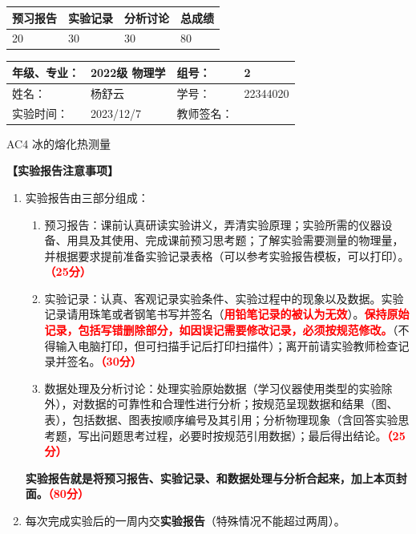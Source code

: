 \documentclass[dvipsnames, svgnames,a4paper,11pt]{article}
\begin{document}
	
	
	
	\begin{table}
		\renewcommand\arraystretch{1.7}
		\begin{tabularx}{\textwidth}{
				|X|X|X|X
				|X|X|X|X|}
			\hline
			\multicolumn{2}{|c|}{预习报告}&\multicolumn{2}{|c|}{实验记录}&\multicolumn{2}{|c|}{分析讨论}&\multicolumn{2}{|c|}{总成绩}\\
			\hline
			\LARGE20 & & \LARGE30 & & \LARGE30 & & \LARGE80 & \\
			\hline
		\end{tabularx}
	\end{table}
	
	\begin{table}
		\renewcommand\arraystretch{1.7}
		\begin{tabularx}{\textwidth}{|X|X|X|X|}
			\hline
			年级、专业： & 2022级 物理学 &组号： & 2\\
			\hline
			姓名： & 杨舒云  & 学号： & 22344020\\
			\hline
			实验时间： & 2023/12/7 & 教师签名： & \\
			\hline
		\end{tabularx}
	\end{table}
	
	\begin{center}
		\LARGE AC4 \quad 冰的熔化热测量
	\end{center}
	
	\textbf{【实验报告注意事项】}
	\begin{enumerate}
		\item 实验报告由三部分组成：
		\begin{enumerate}
			\item 预习报告：课前认真研读实验讲义，弄清实验原理；实验所需的仪器设备、用具及其使用、完成课前预习思考题；了解实验需要测量的物理量，并根据要求提前准备实验记录表格（可以参考实验报告模板，可以打印）。\textcolor{red}{\textbf{（25分）}}
			\item 实验记录：认真、客观记录实验条件、实验过程中的现象以及数据。实验记录请用珠笔或者钢笔书写并签名（\textcolor{red}{\textbf{用铅笔记录的被认为无效}}）。\textcolor{red}{\textbf{保持原始记录，包括写错删除部分，如因误记需要修改记录，必须按规范修改。}}（不得输入电脑打印，但可扫描手记后打印扫描件）；离开前请实验教师检查记录并签名。\textcolor{red}{\textbf{（30分）}}
			\item 数据处理及分析讨论：处理实验原始数据（学习仪器使用类型的实验除外），对数据的可靠性和合理性进行分析；按规范呈现数据和结果（图、表），包括数据、图表按顺序编号及其引用；分析物理现象（含回答实验思考题，写出问题思考过程，必要时按规范引用数据）；最后得出结论。\textcolor{red}{\textbf{（25分）}}
		\end{enumerate}
		\textbf{实验报告就是将预习报告、实验记录、和数据处理与分析合起来，加上本页封面。\textcolor{red}{（80分）}}
		\item 每次完成实验后的一周内交\textbf{实验报告}（特殊情况不能超过两周）。
	\end{enumerate}
	
\end{document}
